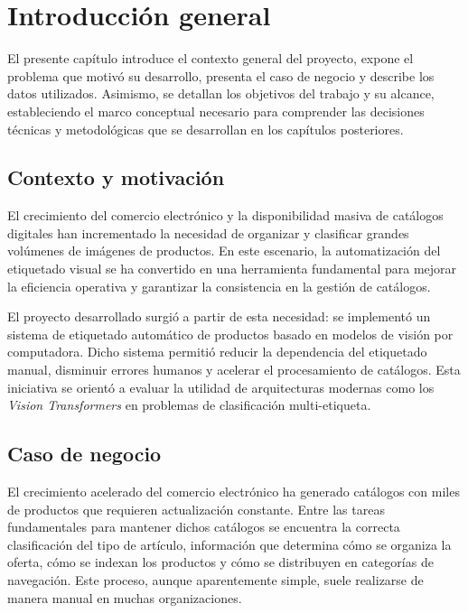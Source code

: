 
\chapter{Introducción general}
\label{Chapter1}
\label{IntroGeneral}

El presente capítulo introduce el contexto general del proyecto, expone el problema que motivó su desarrollo, presenta el caso de negocio y describe los datos utilizados. Asimismo, se detallan los objetivos del trabajo y su alcance, estableciendo el marco conceptual necesario para comprender las decisiones técnicas y metodológicas que se desarrollan en los capítulos posteriores.

\section{Contexto y motivación}

El crecimiento del comercio electrónico y la disponibilidad masiva de catálogos digitales han incrementado la necesidad de organizar y clasificar grandes volúmenes de imágenes de productos. En este escenario, la automatización del etiquetado visual se ha convertido en una herramienta fundamental para mejorar la eficiencia operativa y garantizar la consistencia en la gestión de catálogos.

El proyecto desarrollado surgió a partir de esta necesidad: se implementó un sistema de etiquetado automático de productos basado en modelos de visión por computadora. Dicho sistema permitió reducir la dependencia del etiquetado manual, disminuir errores humanos y acelerar el procesamiento de catálogos. Esta iniciativa se orientó a evaluar la utilidad de arquitecturas modernas como los \textit{Vision Transformers} en problemas de clasificación multi-etiqueta.

\section{Caso de negocio}

El crecimiento acelerado del comercio electrónico ha generado catálogos con miles de productos que requieren actualización constante. Entre las tareas fundamentales para mantener dichos catálogos se encuentra la correcta clasificación del tipo de artículo, información que determina cómo se organiza la oferta, cómo se indexan los productos y cómo se distribuyen en categorías de navegación. Este proceso, aunque aparentemente simple, suele realizarse de manera manual en muchas organizaciones.

